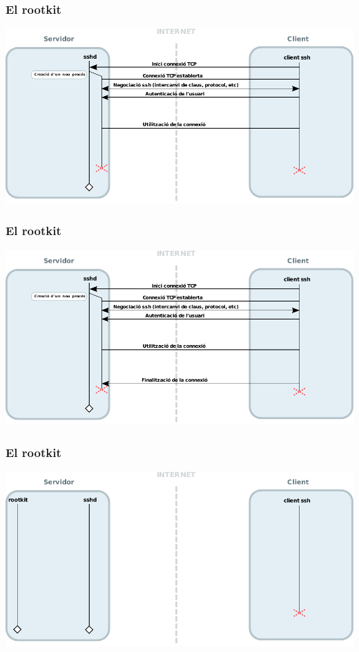 \documentclass{beamer}
\begin{document}
\begin{frame}
	\frametitle{El rootkit}
	\includegraphics[scale=0.65,keepaspectratio]{sshd_6.pdf}
\end{frame}

\begin{frame}
	\frametitle{El rootkit}
	\includegraphics[scale=0.65,keepaspectratio]{sshd.pdf}
\end{frame}

\begin{frame}
	\frametitle{El rootkit}
	\includegraphics[scale=0.65,keepaspectratio]{sshd_keylogger_1.pdf}
\end{frame}
\end{document}
